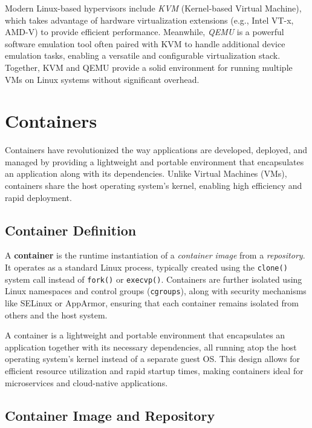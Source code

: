 Modern Linux-based hypervisors include \textit{KVM} (Kernel-based Virtual Machine), which takes advantage of hardware virtualization extensions (e.g., Intel VT-x, AMD-V) to provide efficient performance. Meanwhile, \textit{QEMU} is a powerful software emulation tool often paired with KVM to handle additional device emulation tasks, enabling a versatile and configurable virtualization stack. Together, KVM and QEMU provide a solid environment for running multiple VMs on Linux systems without significant overhead.

\section{Containers}

Containers have revolutionized the way applications are developed, deployed, and managed by providing a lightweight and portable environment that encapsulates an application along with its dependencies. Unlike Virtual Machines (VMs), containers share the host operating system's kernel, enabling high efficiency and rapid deployment.

\subsection{Container Definition}

A \textbf{container} is the runtime instantiation of a \textit{container image} from a \textit{repository}. It operates as a standard Linux process, typically created using the \texttt{clone()} system call instead of \texttt{fork()} or \texttt{execvp()}. Containers are further isolated using Linux namespaces and control groups (\texttt{cgroups}), along with security mechanisms like SELinux or AppArmor, ensuring that each container remains isolated from others and the host system.

\begin{definitionblock}[Container]
A container is a lightweight and portable environment that encapsulates an application together with its necessary dependencies, all running atop the host operating system’s kernel instead of a separate guest OS. This design allows for efficient resource utilization and rapid startup times, making containers ideal for microservices and cloud-native applications.
\end{definitionblock}

\subsection{Container Image and Repository}

